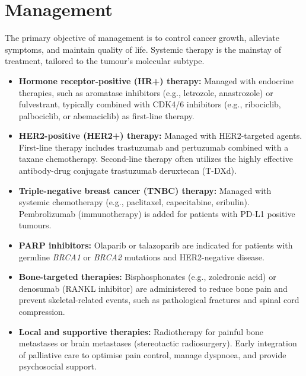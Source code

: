 \section*{Management}
The primary objective of management is to control cancer growth, alleviate symptoms, and maintain quality of life. Systemic therapy is the mainstay of treatment, tailored to the tumour's molecular subtype.
\begin{itemize}
    \item \textbf{Hormone receptor-positive (HR+) therapy:} Managed with endocrine therapies, such as aromatase inhibitors (e.g., letrozole, anastrozole) or fulvestrant, typically combined with CDK4/6 inhibitors (e.g., ribociclib, palbociclib, or abemaciclib) as first-line therapy.
    \item \textbf{HER2-positive (HER2+) therapy:} Managed with HER2-targeted agents. First-line therapy includes trastuzumab and pertuzumab combined with a taxane chemotherapy. Second-line therapy often utilizes the highly effective antibody-drug conjugate trastuzumab deruxtecan (T-DXd).
    \item \textbf{Triple-negative breast cancer (TNBC) therapy:} Managed with systemic chemotherapy (e.g., paclitaxel, capecitabine, eribulin). Pembrolizumab (immunotherapy) is added for patients with PD-L1 positive tumours.
    \item \textbf{PARP inhibitors:} Olaparib or talazoparib are indicated for patients with germline \textit{BRCA1} or \textit{BRCA2} mutations and HER2-negative disease.
    \item \textbf{Bone-targeted therapies:} Bisphosphonates (e.g., zoledronic acid) or denosumab (RANKL inhibitor) are administered to reduce bone pain and prevent skeletal-related events, such as pathological fractures and spinal cord compression.
    \item \textbf{Local and supportive therapies:} Radiotherapy for painful bone metastases or brain metastases (stereotactic radiosurgery). Early integration of palliative care to optimise pain control, manage dyspnoea, and provide psychosocial support.
\end{itemize}

